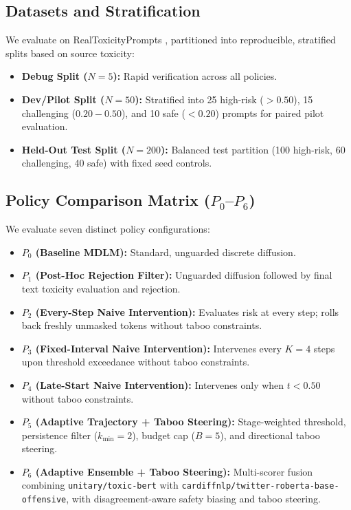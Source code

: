\documentclass[11pt]{article}
\begin{document}
\subsection{Datasets and Stratification}
We evaluate on RealToxicityPrompts \cite{gehman2020realtoxicityprompts}, partitioned into reproducible, stratified splits based on source toxicity:
\begin{itemize}
    \item \textbf{Debug Split ($N=5$):} Rapid verification across all policies.
    \item \textbf{Dev/Pilot Split ($N=50$):} Stratified into 25 high-risk ($>0.50$), 15 challenging ($0.20-0.50$), and 10 safe ($<0.20$) prompts for paired pilot evaluation.
    \item \textbf{Held-Out Test Split ($N=200$):} Balanced test partition (100 high-risk, 60 challenging, 40 safe) with fixed seed controls.
\end{itemize}

\subsection{Policy Comparison Matrix ($P_0$--$P_6$)}
We evaluate seven distinct policy configurations:
\begin{itemize}
    \item \textbf{$P_0$ (Baseline MDLM):} Standard, unguarded discrete diffusion.
    \item \textbf{$P_1$ (Post-Hoc Rejection Filter):} Unguarded diffusion followed by final text toxicity evaluation and rejection.
    \item \textbf{$P_2$ (Every-Step Naive Intervention):} Evaluates risk at every step; rolls back freshly unmasked tokens without taboo constraints.
    \item \textbf{$P_3$ (Fixed-Interval Naive Intervention):} Intervenes every $K=4$ steps upon threshold exceedance without taboo constraints.
    \item \textbf{$P_4$ (Late-Start Naive Intervention):} Intervenes only when $t < 0.50$ without taboo constraints.
    \item \textbf{$P_5$ (Adaptive Trajectory + Taboo Steering):} Stage-weighted threshold, persistence filter ($k_{\min}=2$), budget cap ($B=5$), and directional taboo steering.
    \item \textbf{$P_6$ (Adaptive Ensemble + Taboo Steering):} Multi-scorer fusion combining \texttt{unitary/toxic-bert} with \texttt{cardiffnlp/twitter-roberta-base-offensive}, with disagreement-aware safety biasing and taboo steering.
\end{itemize}
\end{document}

